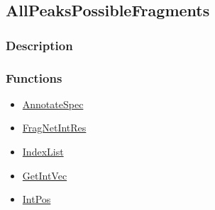 \subsection{AllPeaksPossibleFragments}\label{AllPeaksPossibleFragments}
\subsubsection{Description}


\subsubsection{Functions}
\begin{itemize}
\item \hyperref[AnnotateSpec]{AnnotateSpec}
\item \hyperref[FragNetIntRes]{FragNetIntRes}
\item \hyperref[IndexList]{IndexList}
\item \hyperref[GetIntVec]{GetIntVec}
\item \hyperref[IntPos]{IntPos}
\end{itemize}

